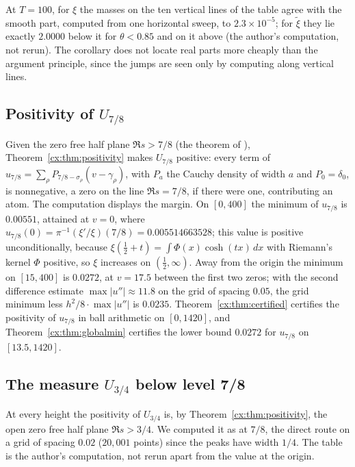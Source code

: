 At $T=100$, for $\xi$ the masses on the ten vertical lines of the table agree with the smooth part, computed from one horizontal sweep, to $2.3\times10^{-5}$; for $\tilde\xi$ they lie exactly $2.0000$ below it for $\theta<0.85$ and on it above (the author's computation, not rerun). The corollary does not locate real parts more cheaply than the argument principle, since the jumps are seen only by computing along vertical lines.

\subsection{Positivity of $U_{7/8}$}

Given the zero free half plane $\Re s>7/8$ (the theorem of \cite{OAI26a}), Theorem~\ref{cx:thm:positivity} makes $U_{7/8}$ positive: every term of $u_{7/8}=\sum_\rho P_{7/8-\sigma_\rho}(v-\gamma_\rho)$, with $P_a$ the Cauchy density of width $a$ and $P_0=\delta_0$, is nonnegative, a zero on the line $\Re s=7/8$, if there were one, contributing an atom. The computation displays the margin. On $[0,400]$ the minimum of $u_{7/8}$ is $0.00551$, attained at $v=0$, where $u_{7/8}(0)=\pi^{-1}(\xi'/\xi)(7/8)=0.005514663528$; this value is positive unconditionally, because $\xi(\tfrac12+t)=\int\Phi(x)\cosh(tx)\,dx$ with Riemann's kernel $\Phi$ positive, so $\xi$ increases on $(\tfrac12,\infty)$. Away from the origin the minimum on $[15,400]$ is $0.0272$, at $v=17.5$ between the first two zeros; with the second difference estimate $\max|u''|\approx11.8$ on the grid of spacing $0.05$, the grid minimum less $h^2/8\cdot\max|u''|$ is $0.0235$. Theorem~\ref{cx:thm:certified} certifies the positivity of $u_{7/8}$ in ball arithmetic on $[0,1420]$, and Theorem~\ref{cx:thm:globalmin} certifies the lower bound $0.0272$ for $u_{7/8}$ on $[13.5,1420]$.

\subsection{The measure $U_{3/4}$ below level 7/8}

At every height the positivity of $U_{3/4}$ is, by Theorem~\ref{cx:thm:positivity}, the open zero free half plane $\Re s>3/4$. We computed it as at $7/8$, the direct route on a grid of spacing $0.02$ ($20{,}001$ points) since the peaks have width $1/4$. The table is the author's computation, not rerun apart from the value at the origin.

